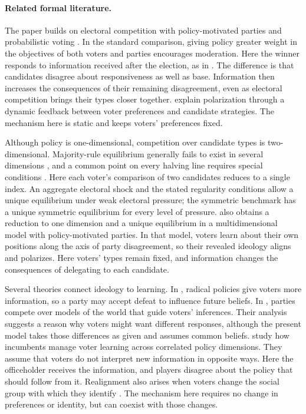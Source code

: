\documentclass[12pt,letterpaper]{article}
\begin{document}
\paragraph{Related formal literature.}
The paper builds on electoral competition with policy-motivated parties \citep{Wittman1983,Calvert1985,Roemer2001} and probabilistic voting \citep{Lindbeck1987}. In the standard comparison, giving policy greater weight in the objectives of both voters and parties encourages moderation. Here the winner responds to information received after the election, as in \citet{KVW2017}. The difference is that candidates disagree about responsiveness as well as base. Information then increases the consequences of their remaining disagreement, even as electoral competition brings their types closer together. \citet{CallanderCarbajal2022} explain polarization through a dynamic feedback between voter preferences and candidate strategies. The mechanism here is static and keeps voters' preferences fixed.

Although policy is one-dimensional, competition over candidate types is two-dimensional. Majority-rule equilibrium generally fails to exist in several dimensions \citep{Plott1967,McKelvey1976}, and a common point on every halving line requires special conditions \citep{DavisDeGrootHinich1972,McKelvey1986}. Here each voter's comparison of two candidates reduces to a single index. An aggregate electoral shock and the stated regularity conditions allow a unique equilibrium under weak electoral pressure; the symmetric benchmark has a unique symmetric equilibrium for every level of pressure. \citet{Vaeth2024} also obtains a reduction to one dimension and a unique equilibrium in a multidimensional model with policy-motivated parties. In that model, voters learn about their own positions along the axis of party disagreement, so their revealed ideology aligns and polarizes. Here voters' types remain fixed, and information changes the consequences of delegating to each candidate.

Several theories connect ideology to learning. In \citet{Izzo2023}, radical policies give voters more information, so a party may accept defeat to influence future beliefs. In \citet{IzzoMartinCallander2023}, parties compete over models of the world that guide voters' inferences. Their analysis suggests a reason why voters might want different responses, although the present model takes those differences as given and assumes common beliefs. \citet{IzzoInvernizziCrosson2025} study how incumbents manage voter learning across correlated policy dimensions. They assume that voters do not interpret new information in opposite ways. Here the officeholder receives the information, and players disagree about the policy that should follow from it. Realignment also arises when voters change the social group with which they identify \citep{BonomiGennaioliTabellini2021,GennaioliTabellini2025}. The mechanism here requires no change in preferences or identity, but can coexist with those changes.
\end{document}

